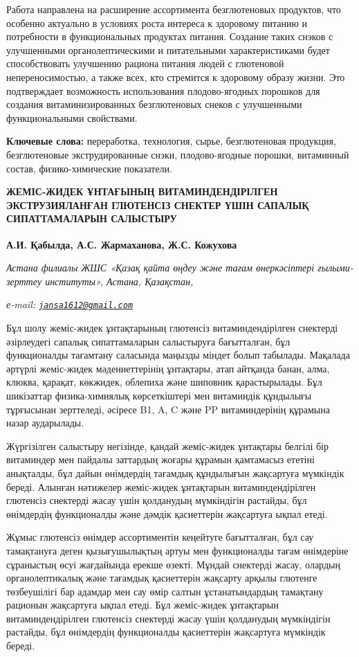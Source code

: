 {Работа направлена на расширение ассортимента безглютеновых продуктов,
что особенно актуально в условиях роста интереса к здоровому питанию и
потребности в функциональных продуктах питания. Создание таких снэков с
улучшенными органолептическими и питательными характеристиками будет
способствовать улучшению рациона питания людей с глютеновой
непереносимостью, а также всех, кто стремится к здоровому образу жизни.
Это подтверждает возможность использования плодово-ягодных порошков для
создания витаминизированных безглютеновых снеков с улучшенными
функциональными свойствами.

{\bfseries Ключевые слова:} переработка, технология, сырье, безглютеновая
продукция, безглютеновые экструдированные снэки, плодово-ягодные
порошки, витаминный состав, физико-химические показатели.

{\bfseries ЖЕМІС-ЖИДЕК ҰНТАҒЫНЫҢ ВИТАМИНДЕНДІРІЛГЕН ЭКСТРУЗИЯЛАНҒАН
ГЛЮТЕНСІЗ СНЕКТЕР ҮШІН САПАЛЫҚ СИПАТТАМАЛАРЫН САЛЫСТЫРУ}

{\bfseries А.И. Қабылда, А.С. Жармаханова, Ж.С.
Кожухова\textsuperscript{\envelope }}

\emph{Астана филиалы ЖШС «Қазақ қайта өңдеу және тағам өнеркәсіптері
ғылыми-зерттеу институты», Астана, Қазақстан,}

\emph{е-mail:
\href{mailto:jansa1612@gmail.com}{\nolinkurl{jansa1612@gmail.com}}}

Бұл шолу жеміс-жидек ұнтақтарының глютенсіз витаминдендірілген снектерді
әзірлеудегі сапалық сипаттамаларын салыстыруға бағытталған, бұл
функционалды тағамтану саласында маңызды міндет болып табылады. Мақалада
әртүрлі жеміс-жидек мәдениеттерінің ұнтақтары, атап айтқанда банан,
алма, клюква, қарақат, көкжидек, облепиха және шиповник қарастырылады.
Бұл шикізаттар физика-химиялық көрсеткіштері мен витаминдік құндылығы
тұрғысынан зерттеледі, әсіресе B1, A, C және PP витаминдерінің құрамына
назар аударылады.

Жүргізілген салыстыру негізінде, қандай жеміс-жидек ұнтақтары белгілі
бір витаминдер мен пайдалы заттардың жоғары құрамын қамтамасыз ететіні
анықталды, бұл дайын өнімдердің тағамдық құндылығын жақсартуға мүмкіндік
береді. Алынған нәтижелер жеміс-жидек ұнтақтарын витаминдендірілген
глютенсіз снектерді жасау үшін қолданудың мүмкіндігін растайды, бұл
өнімдердің функционалды және дәмдік қасиеттерін жақсартуға ықпал етеді.

Жұмыс глютенсіз өнімдер ассортиментін кеңейтуге бағытталған, бұл сау
тамақтануға деген қызығушылықтың артуы мен функционалды тағам өнімдеріне
сұраныстың өсуі жағдайында ерекше өзекті. Мұндай снектерді жасау,
олардың органолептикалық және тағамдық қасиеттерін жақсарту арқылы
глютенге төзбеушілігі бар адамдар мен сау өмір салтын ұстанатындардың
тамақтану рационын жақсартуға ықпал етеді. Бұл жеміс-жидек ұнтақтарын
витаминдендірілген глютенсіз снектерді жасау үшін қолданудың мүмкіндігін
растайды, бұл өнімдердің функционалды қасиеттерін жақсартуға мүмкіндік
береді.

}
